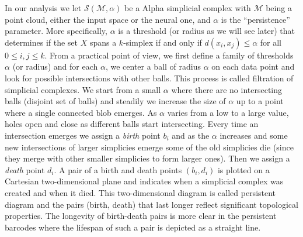 In our analysis we let $\mathcal{S}(\mathcal{M}, \alpha)$ be a Alpha simplicial complex with $\mathcal{M}$ being a point cloud, either the input space or the neural one, and $\alpha$ is the ``persistence'' parameter. More specifically, $\alpha$ is a threshold (or radius as we will see later) that determines if the set $X$ spans a $k$-simplex if and only if $d(x_i, x_j) \leq \alpha$ for all $0 \leq i, j \leq k$. From a practical point of view, we first define a family of thresholds $\alpha$ (or radius) and for each $\alpha$, we center a ball of radius $\alpha$ on each data point and look for possible intersections with other balls. This process is called filtration of simplicial complexes. We start from a small $\alpha$ where there are no intersecting balls (disjoint set of balls) and steadily we increase the size of $\alpha$ up to a point where a single connected blob emerges. As $\alpha$ varies from a low to a large value, holes open and close as different balls start intersecting. Every time an intersection emerges we assign a {\em birth} point $b_i$ and as the $\alpha$ increases and some new intersections of larger simplicies emerge some of the old simplicies die (since they merge with  other smaller simplicies to form larger ones). Then we assign a {\em death} point $d_i$. A pair of a birth and death points $(b_i, d_i)$ is plotted on a Cartesian two-dimensional plane and indicates when a simplicial complex was created and when it died. This two-dimensional diagram is called persistent diagram and the pairs (birth, death) that last longer reflect significant topological properties. The longevity of birth-death pairs is more clear in the persistent barcodes where the lifespan of such a pair is depicted as a straight line.

